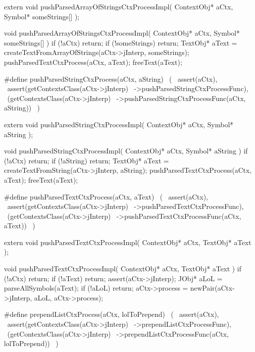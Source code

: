 \startCHeader
extern void pushParsedArrayOfStringsCtxProcessImpl(
  ContextObj* aCtx,
  Symbol* someStrings[]
);
\stopCHeader
{}

\startCCode
void pushParsedArrayOfStringsCtxProcessImpl(
  ContextObj* aCtx,
  Symbol* someStrings[]
) {
  if (!aCtx) return;
  if (!someStrings) return;
  TextObj* aText =
    createTextFromArrayOfStrings(aCtx->jInterp, someStrings);
  pushParsedTextCtxProcess(aCtx, aText);
  freeText(aText);
}
\stopCCode

\startCHeader
#define pushParsedStringCtxProcess(aCtx, aString)      \
  (                                                    \
    assert(aCtx),                                      \
    assert(getContextsClass(aCtx->jInterp)             \
      ->pushParsedStringCtxProcessFunc),               \
    (getContextsClass(aCtx->jInterp)                   \
      ->pushParsedStringCtxProcessFunc(aCtx, aString)) \
  )
\stopCHeader

\setCHeaderStream{private}
\startCHeader
extern void pushParsedStringCtxProcessImpl(
  ContextObj* aCtx,
  Symbol* aString
);
\stopCHeader
\setCHeaderStream{public}

\startCCode
void pushParsedStringCtxProcessImpl(
  ContextObj* aCtx,
  Symbol* aString
) {
  if (!aCtx) return;
  if (!aString) return;
  TextObj* aText =
    createTextFromString(aCtx->jInterp, aString);
  pushParsedTextCtxProcess(aCtx, aText);
  freeText(aText);
}
\stopCCode

\startCHeader
#define pushParsedTextCtxProcess(aCtx, aText)      \
  (                                                \
    assert(aCtx),                                  \
    assert(getContextsClass(aCtx->jInterp)         \
      ->pushParsedTextCtxProcessFunc),             \
    (getContextsClass(aCtx->jInterp)               \
      ->pushParsedTextCtxProcessFunc(aCtx, aText)) \
  )
\stopCHeader

\startCHeader
extern void pushParsedTextCtxProcessImpl(
  ContextObj* aCtx,
  TextObj* aText
);
\stopCHeader
\setCHeaderStream{public}

\startCCode
void pushParsedTextCtxProcessImpl(
  ContextObj* aCtx,
  TextObj* aText
) {
  if (!aCtx) return;
  if (!aText) return;
  assert(aCtx->jInterp);
  JObj* aLoL = parseAllSymbols(aText);
  if (!aLoL) return;
  aCtx->process = newPair(aCtx->jInterp, aLoL, aCtx->process);
}
\stopCCode

\startCHeader
#define prependListCtxProcess(aCtx, lolToPrepend)      \
  (                                                    \
    assert(aCtx),                                      \
    assert(getContextsClass(aCtx->jInterp)             \
      ->prependListCtxProcessFunc),                    \
    (getContextsClass(aCtx->jInterp)                   \
      ->prependListCtxProcessFunc(aCtx, lolToPrepend)) \
  )
\stopCHeader

